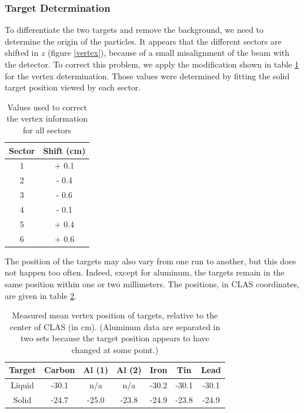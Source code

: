 \subsubsection{Target Determination}

To differentiate the two targets and remove the background, we need to 
determine the origin of the particles. It appears that the different sectors 
are shifted in $z$ (figure \ref{vertex}), because of a small misalignment of 
the beam with the detector. To correct this problem, we apply the modification shown in table 
\ref{tab:vertex} for the vertex determination. Those values were determined by 
fitting the solid target position viewed by each sector.

\begin{table}[p]
  \centering
  \begin{tabular}{@{} cc @{}}
    \hline
    Sector & Shift (cm) \\ 
    \hline
    1 & + 0.1 \\ 
    2 & - 0.4 \\ 
    3 & - 0.6 \\ 
    4 & - 0.1 \\ 
    5 & + 0.4 \\ 
    6 & + 0.6 \\ 
    \hline
  \end{tabular}
  \caption{Values used to correct the vertex information for all sectors}
  \label{tab:vertex}
\end{table}

The position of the targets may also vary from one run to another, but 
this does not happen too often. Indeed, except for aluminum, the targets remain in 
the same position within one or two millimeters. The positions, in CLAS 
coordinates, are given in table \ref{tab:targets}.

\begin{table}[p]
  \centering
  \begin{tabular}{|c|c|c|c|c|c|c|}
    \hline
    Target & Carbon & Al (1) & Al (2) & Iron   & Tin    & Lead   \\ 
    \hline \hline
    Liquid & -30.1  & n/a    & n/a    & -30.2  & -30.1  & -30.1  \\ 
    Solid  & -24.7  & -25.0  & -23.8  & -24.9  & -23.8  & -24.9  \\
    \hline
  \end{tabular}
  \caption{Measured mean vertex position of targets, relative to the center of 
           CLAS (in cm). (Aluminum data are separated in two sets because the 
           target position appears to have changed at some point.)}
  \label{tab:targets}
\end{table}

